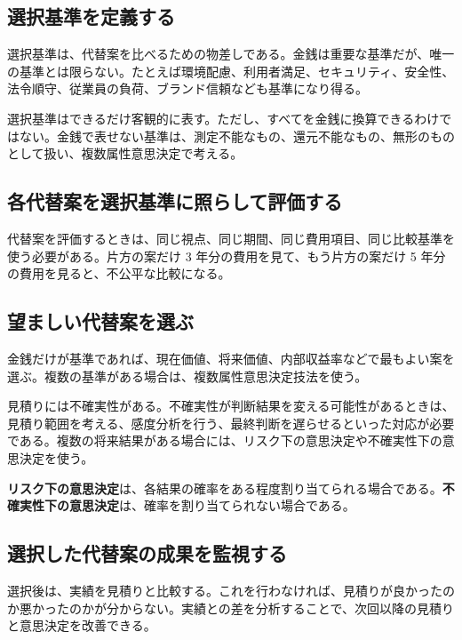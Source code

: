 \documentclass[a4paper,11pt]{article}
\newcommand{\smallterm}[1]{\textbf{#1}}
\begin{document}
\subsection{選択基準を定義する}

選択基準は、代替案を比べるための物差しである。金銭は重要な基準だが、唯一の基準とは限らない。たとえば環境配慮、利用者満足、セキュリティ、安全性、法令順守、従業員の負荷、ブランド信頼なども基準になり得る。

選択基準はできるだけ客観的に表す。ただし、すべてを金銭に換算できるわけではない。金銭で表せない基準は、測定不能なもの、還元不能なもの、無形のものとして扱い、複数属性意思決定で考える。

\subsection{各代替案を選択基準に照らして評価する}

代替案を評価するときは、同じ視点、同じ期間、同じ費用項目、同じ比較基準を使う必要がある。片方の案だけ 3 年分の費用を見て、もう片方の案だけ 5 年分の費用を見ると、不公平な比較になる。

\subsection{望ましい代替案を選ぶ}

金銭だけが基準であれば、現在価値、将来価値、内部収益率などで最もよい案を選ぶ。複数の基準がある場合は、複数属性意思決定技法を使う。

見積りには不確実性がある。不確実性が判断結果を変える可能性があるときは、見積り範囲を考える、感度分析を行う、最終判断を遅らせるといった対応が必要である。複数の将来結果がある場合には、リスク下の意思決定や不確実性下の意思決定を使う。

\begin{termnote}
\smallterm{リスク下の意思決定}は、各結果の確率をある程度割り当てられる場合である。\smallterm{不確実性下の意思決定}は、確率を割り当てられない場合である。
\end{termnote}

\subsection{選択した代替案の成果を監視する}

選択後は、実績を見積りと比較する。これを行わなければ、見積りが良かったのか悪かったのかが分からない。実績との差を分析することで、次回以降の見積りと意思決定を改善できる。
\end{document}
